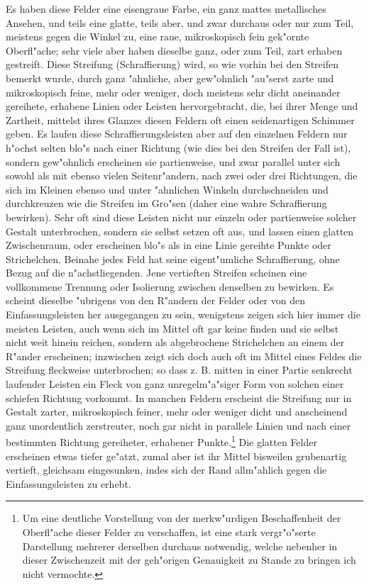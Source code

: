 \documentclass[a4paper, 11pt, oneside, german]{article}
\begin{document}
Es haben diese Felder eine eisengraue Farbe, ein ganz mattes metallisches Ansehen, und teils eine glatte, teils aber, und zwar durchaus oder nur zum Teil, meistens gegen die Winkel zu, eine raue, mikroskopisch fein gek"ornte Oberfl"ache; sehr viele aber haben dieselbe ganz, oder zum Teil, zart erhaben gestreift. Diese Streifung (Schraffierung) wird, so wie vorhin bei den Streifen bemerkt wurde, durch ganz "ahnliche, aber gew"ohnlich "au"serst zarte und mikroskopisch feine, mehr oder weniger, doch meistens sehr dicht aneinander gereihete, erhabene Linien oder Leisten hervorgebracht, die, bei ihrer Menge und Zartheit, mittelst ihres Glanzes diesen Feldern oft einen seidenartigen Schimmer geben. Es laufen diese Schraffierungsleisten aber auf den einzelnen Feldern nur h"ochst selten blo"s nach einer Richtung (wie dies bei den Streifen der Fall ist), sondern gew"ohnlich erscheinen sie partienweise, und zwar parallel unter sich sowohl als mit ebenso vielen Seitenr"andern, nach zwei oder drei Richtungen, die sich im Kleinen ebenso und unter "ahnlichen Winkeln durchschneiden und durchkreuzen wie die Streifen im Gro"sen (daher eine wahre Schraffierung bewirken). Sehr oft sind diese Leisten nicht nur einzeln oder partienweise solcher Gestalt unterbrochen, sondern sie selbst setzen oft aus, und lassen einen glatten Zwischenraum, oder erscheinen blo"s als in eine Linie gereihte Punkte oder Strichelchen. Beinahe jedes Feld hat seine eigent"umliche Schraffierung, ohne Bezug auf die n"achstliegenden. Jene vertieften Streifen scheinen eine vollkommene Trennung oder Isolierung zwischen denselben zu bewirken. Es scheint dieselbe "ubrigens von den R"andern der Felder oder von den Einfassungsleisten her ausgegangen zu sein, wenigstens zeigen sich hier immer die meisten Leisten, auch wenn sich im Mittel oft gar keine finden und sie selbst nicht weit hinein reichen, sondern als abgebrochene Strichelchen an einem der R"ander erscheinen; inzwischen zeigt sich doch auch oft im Mittel eines Feldes die Streifung fleckweise unterbrochen; so dass z. B. mitten in einer Partie senkrecht laufender Leisten ein Fleck von ganz unregelm"a"siger Form von solchen einer schiefen Richtung vorkommt. In manchen Feldern erscheint die Streifung nur in Gestalt zarter, mikroskopisch feiner, mehr oder weniger dicht und anscheinend ganz unordentlich zerstreuter, noch gar nicht in parallele Linien und nach einer bestimmten Richtung gereiheter, erhabener Punkte.\footnote{Um eine deutliche Vorstellung von der merkw"urdigen Beschaffenheit der Oberfl"ache dieser Felder zu verschaffen, ist eine stark vergr"o"serte Darstellung mehrerer derselben durchaus notwendig, welche nebenher in dieser Zwischenzeit mit der geh"origen Genauigkeit zu Stande zu bringen ich nicht vermochte.} Die glatten Felder erscheinen etwas tiefer ge"atzt, zumal aber ist ihr Mittel bisweilen grubenartig vertieft, gleichsam eingesunken, indes sich der Rand allm"ahlich gegen die Einfassungsleisten zu erhebt.
\end{document}
